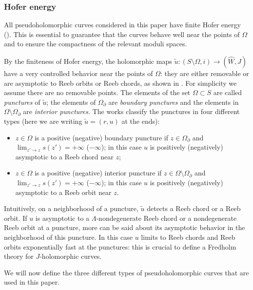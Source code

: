 \documentclass[10pt]{amsart}
\theoremstyle{plain}
\theoremstyle{definition}
\numberwithin{equation}{subsection}
\begin{document}
\subsubsection{Hofer energy}

All pseudoholomorphic curves considered in this paper have finite Hofer energy (\cf \cite{H,CPT}). This is essential to guarantee that the curves behave well near the points of $\Omega$ and to ensure the compactness of the relevant moduli spaces.

By the finiteness of Hofer energy, the holomorphic maps $\widetilde{u}: (S\setminus \Omega,i)\to (\widehat{W},J)$ have a very controlled behavior near the points of $\Omega$: they are either removable or are asymptotic to Reeb orbits or Reeb chords, as shown in \cite{Ab,H,HWZ}. For simplicity we assume there are no removable points.
The elements of the set $\Omega \subset S$ are called {\em punctures} of $\widetilde{u}$; the elements of $\Omega_\partial$ are {\em boundary punctures} and the elements in $\Omega \setminus \Omega_\partial$ are {\em interior punctures.} The works \cite{Ab,H,HWZ} classify the punctures in four different types (here we are writing $\widetilde{u}=(r,u)$ at the ends):
\begin{itemize}
\item $z \in \Omega$ is a positive (\resp negative) boundary puncture if $z \in \Omega_\partial$ and $\lim_{z' \to z} s(z') = +\infty$ (\resp $-\infty$); in this case $u$ is positively (\resp negatively) asymptotic to a Reeb chord near $z$;

\item $z \in \Omega$ is a positive (\resp negative) interior puncture if $z \in \Omega \setminus \Omega_\partial$ and $\lim_{z' \to z} s(z') = +\infty$ (\resp $-\infty$); in this case $u$ is positively (\resp negatively) asymptotic to a Reeb orbit near $z$.

\end{itemize}
Intuitively, on a neighborhood of a puncture, $\widetilde{u}$ detects a Reeb chord or a Reeb orbit. If $u$ is asymptotic to a $\Lambda$-nondegenerate Reeb chord or a nondegenerate Reeb orbit at a puncture, more can be said about its asymptotic behavior in the neighborhood of this puncture. In this case $u$ limits to Reeb chords and Reeb orbits exponentially fast at the punctures: this is crucial to define a Fredholm theory for $J$-holomorphic curves.

We will now define the three different types of pseudoholomorphic curves that are used in this paper.
\end{document}
